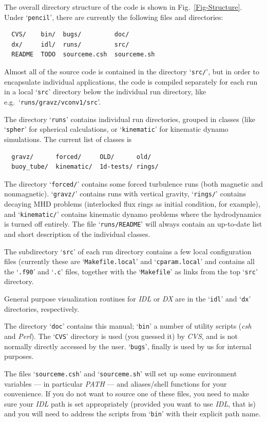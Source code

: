 \documentclass[12pt,twoside,notitlepage,a4paper]{article}
\makeatletter
\newcommand{\var}[1]{\textsl{#1}\index{#1@\emph{#1}}\/}
\newcommand{\file}[1]{`\texttt{#1}'}
\newcommand{\name}[1]{\textsl{#1}\index{#1}\/}
\makeatother
\begin{document}
The overall directory structure of the code is shown in
Fig.~\ref{Fig-Structure}.
Under \file{pencil}, there are currently the following
files and directories:
\begin{verbatim}
  CVS/    bin/  bugs/         doc/
  dx/     idl/  runs/         src/
  README  TODO  sourceme.csh  sourceme.sh
\end{verbatim}

Almost all of the source code is contained in the directory \file{src/},
but in order to encapsulate individual applications, the code is compiled
separately for each run in a local \file{src} directory below the
individual run directory, like e.g.~\file{runs/gravz/vconv1/src}.

The directory \file{runs} contains individual run directories, grouped in
classes (like \file{spher} for spherical calculations, or \file{kinematic}
for kinematic dynamo simulations.
The current list of classes is
\begin{verbatim}
  gravz/      forced/     OLD/      old/
  buoy_tube/  kinematic/  1d-tests/ rings/
\end{verbatim}
The directory \file{forced/} contains some forced turbulence runs (both
magnetic and nonmagnetic). 
\file{gravz/} contains runs with vertical gravity, \file{rings/}
contains decaying MHD problems (interlocked flux rings as initial condition, for
example), and \file{kinematic/} contains kinematic dynamo problems where the
hydrodynamics is turned off entirely.
The file \file{runs/README} will always contain an up-to-date list and
short description of the individual classes.

The subdirectory \file{src} of each run directory contains a few local
configuration files (currently these are \file{Makefile.local} and
\file{cparam.local} and contains all the \file{.f90} and \file{.c} files,
together with the \file{Makefile} as links from the top \file{src}
directory.

General purpose visualization routines for \name{IDL} or \name{DX} are in the
\file{idl} and \file{dx} directories, respectively.

The directory \file{doc} contains this manual; \file{bin} a number of
utility scripts (\name{csh} and \name{Perl}).
The \file{CVS} directory is used (you guessed it) by \name{CVS}, and is
not normally directly accessed by the user.
\file{bugs}, finally is used by us for internal purposes.

\bigskip

The files \file{sourceme.csh} and \file{sourceme.sh} will set up some
environment variables --- in particular \var{PATH} --- and aliases/shell
functions for your convenience.
If you do not want to source one of these files, you need to make sure
your \name{IDL} path is set appropriately (provided you want to use
\name{IDL}, that is) and you will need to address the scripts from
\file{bin} with their explicit path name.
\end{document}
